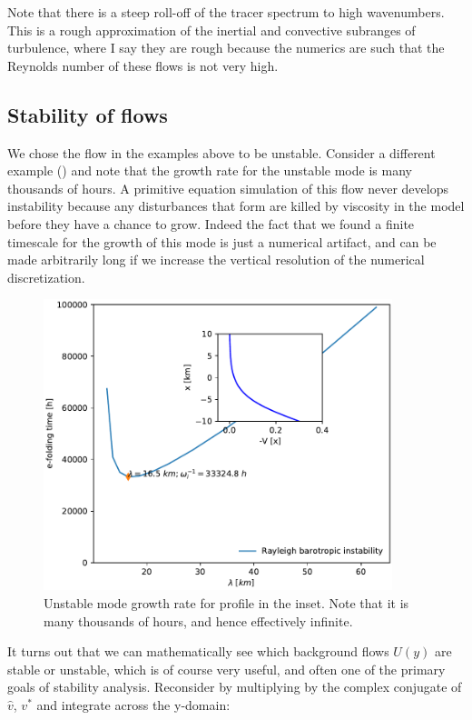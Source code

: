 \documentclass[11pt]{article}
\begin{document}
Note that there is a steep roll-off of the tracer spectrum to high wavenumbers.
This is a rough approximation of the inertial and convective subranges of
turbulence, where I say they are rough because the numerics are such that the
Reynolds number of these flows is not very high. 

\clearpage

\subsection{Stability of flows}

We chose the flow in the examples above to be unstable.  Consider a different
example () and note that the growth rate
for the unstable mode is many thousands of hours.  A primitive equation
simulation of this flow never develops instability because any disturbances
that form are killed by viscosity in the model before they have a chance to
grow.  Indeed the fact that we found a finite timescale for the growth of this
mode is just a numerical artifact, and can be made arbitrarily long if we
increase the vertical resolution of the numerical discretization.  

\begin{figure}[hbtp]
  \begin{center}
    \includegraphics[width=4in]{images/RayleighInstabilityStable.pdf}
  \end{center}
  \caption{Unstable mode growth rate for profile in the inset.  Note that it is
many thousands of hours, and hence effectively infinite.}
  \label{fig:RayleighInstabilityStable}
\end{figure}

It turns out that we can mathematically see which background flows $U(y)$ are
stable or unstable, which is of course very useful, and often one of the
primary goals of stability analysis.  Reconsider  by
multiplying by the complex conjugate of $\hat{v}$, $v^*$ and integrate across
the y-domain:
\end{document}
